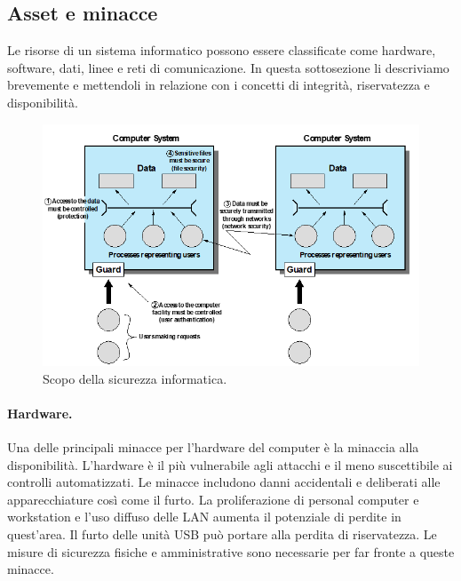 \subsection{Asset e minacce}
Le risorse di un sistema informatico possono essere classificate come hardware, software, dati, linee e reti di comunicazione. In questa sottosezione li descriviamo brevemente e mettendoli in relazione con i concetti di integrità, riservatezza e
disponibilità. 

\begin{figure}[H]
	\centering
    \includegraphics[width=14cm, keepaspectratio]{bistarelli/img/cap_1/asset_sec.png}
	\caption{ Scopo della sicurezza informatica.}\label{fig:asset_sec}
\end{figure}

\paragraph{Hardware.} Una delle principali minacce per l'hardware  del computer è la minaccia alla disponibilità. L'hardware è il più vulnerabile agli attacchi e il meno suscettibile ai controlli automatizzati. Le minacce includono danni accidentali e deliberati alle apparecchiature così come il furto. La proliferazione di personal computer e workstation e l'uso diffuso delle LAN aumenta il potenziale di perdite in quest'area. Il furto delle unità USB può portare alla perdita di riservatezza. Le misure di sicurezza fisiche e amministrative sono necessarie per far fronte a queste minacce.


